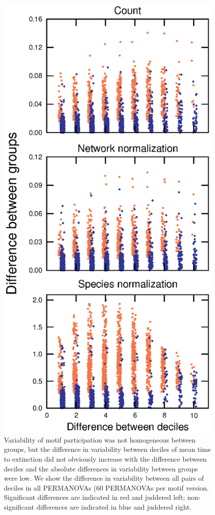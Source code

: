 \documentclass[12pt]{article}
\begin{document}
\begin{spacing}{2.0}
        \begin{figure}[hb!]
            \centering
            \includegraphics[height=.75\textheight]{figures/Tukey_differences.eps}
            \caption{Variability of motif participation was not homogeneous between groups, but the difference in variability between deciles of mean time to extinction did not obviously increase with the difference between deciles and the absolute differences in variability between groups were low. We show the difference in variability between all pairs of deciles in all PERMANOVAs (60 PERMANOVAs per motif version. Significant differences are indicated in red and juddered left; non-significant differences are indicated in blue and juddered right.}
            \label{fig:betadisper_Tukey}
        \end{figure}


\end{spacing}
\end{document}
